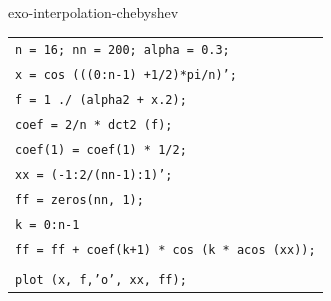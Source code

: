 \begin{correction}{exo-interpolation-chebyshev}
\begin{enumerate}
\begin{listing} \begin{footnotesize}
{\upshape
\begin{tabular}{l} \texttt{n = 16; nn = 200; alpha = 0.3;} \\
\texttt{x = cos (((0:n-1) +1/2)*pi/n)';} \\
\texttt{f = 1 ./ (alpha{\hatverb}2 + x.{\hatverb}2);} \\
\texttt{coef = 2/n * dct2 (f);} \\
\texttt{coef(1) = coef(1) * 1/2;} \\
\texttt{xx = (-1:2/(nn-1):1)';} \\
\texttt{ff = zeros(nn, 1);} \\
\texttt{\pfor k = 0:n-1} \\
\quad \texttt{ff = ff + coef(k+1) * cos (k * acos (xx));} \\
\texttt{\pend} \\
\texttt{plot (x, f,'o', xx, ff);} \\
\end{tabular}
} 
\end{footnotesize}
\caption{Chebyshev interpolation}
\label{listing-interpolation-chebyshev}
\end{listing}
\end{enumerate}
\end{correction}
 

